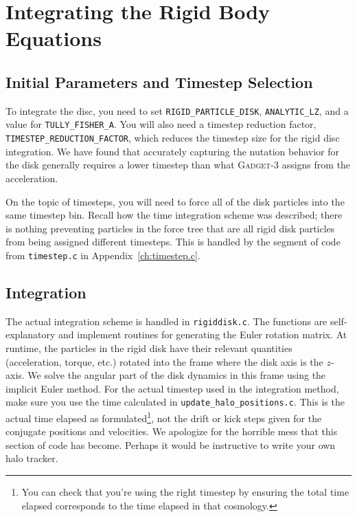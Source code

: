 \section{Integrating the Rigid Body Equations}




\subsection{Initial Parameters and Timestep Selection}
To integrate the disc, you need to set \texttt{RIGID\_PARTICLE\_DISK}, \texttt{ANALYTIC\_LZ}, and a value for \texttt{TULLY\_FISHER\_A}. You will also need a timestep reduction factor, \\\texttt{TIMESTEP\_REDUCTION\_FACTOR}, which reduces the timestep size for the rigid disc integration. We have found that accurately capturing the nutation behavior for the disk generally requires a lower timestep than what \textsc{Gadget-3} assigns from the acceleration.

On the topic of timesteps, you will need to force all of the disk particles into the same timestep bin. Recall how the time integration scheme was described; there is nothing preventing particles in the force tree that are all rigid disk particles from being assigned different timesteps. This is handled by the segment of code from \texttt{timestep.c} in Appendix~\ref{ch:timestep.c}.


\subsection{Integration}

The actual integration scheme is handled in \texttt{rigiddisk.c}. The functions are self-explanatory and implement routines for generating the Euler rotation matrix. At runtime, the particles in the rigid disk have their relevant quantities (acceleration, torque, etc.) rotated into the frame where the disk axis is the $z$-axis. We solve the angular part of the disk dynamics in this frame using the implicit Euler method. For the actual timestep used in the integration method, make sure you use the time calculated in \texttt{update\_halo\_positions.c}. This is the actual time elapsed as formulated\footnote{You can check that you're using the right timestep by ensuring the total time elapsed corresponds to the time elapsed in that cosmology.}, not the drift or kick steps given for the conjugate positions and velocities. We apologize for the horrible mess that this section of code has become. Perhaps it would be instructive to write your own halo tracker.

